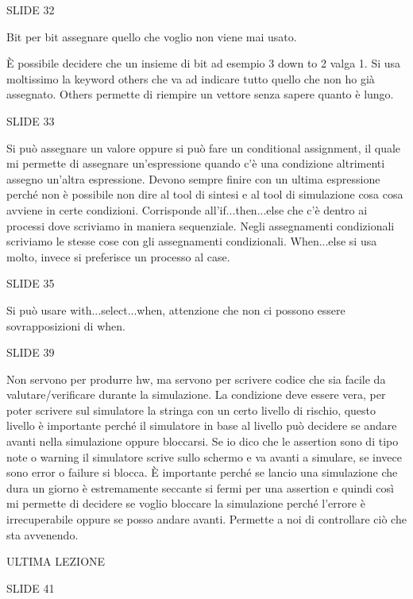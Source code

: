\documentclass[10pt,a4paper,titlepage]{article}
\begin{document}
SLIDE 32

Bit per bit assegnare quello che voglio non viene mai usato.

È possibile decidere che un insieme di bit ad esempio 3 down to 2 valga 1. Si usa moltissimo la keyword others che va ad indicare tutto quello che non ho già assegnato. Others permette di riempire un vettore senza sapere quanto è lungo.﻿

SLIDE 33

Si può assegnare un valore oppure si può fare un conditional assignment, il quale mi permette di assegnare un’espressione quando c’è una condizione altrimenti assegno un’altra espressione. Devono sempre finire con un ultima espressione perché non è possibile non dire al tool di sintesi e al tool di simulazione cosa cosa avviene in certe condizioni. Corrisponde all’if...then...else che c’è dentro ai processi dove scriviamo in maniera sequenziale. Negli assegnamenti condizionali scriviamo le stesse cose con gli assegnamenti condizionali. When...else si usa molto, invece si preferisce un processo al case.﻿

SLIDE 35

Si può usare with...select...when, attenzione che non ci possono essere sovrapposizioni di when.

SLIDE 39

Non servono per produrre hw, ma servono per scrivere codice che sia facile da valutare/verificare durante la simulazione. La condizione deve essere vera, per poter scrivere sul simulatore la stringa con un certo livello di rischio, questo livello è importante perché il simulatore in base al livello può decidere se andare avanti nella simulazione oppure bloccarsi.
Se io dico che le assertion sono di tipo note o warning il simulatore scrive sullo schermo e va avanti a simulare, se invece sono error o failure si blocca.
È importante perché se lancio una simulazione che dura un giorno è estremamente seccante si fermi per una assertion e quindi così mi permette di decidere se voglio bloccare la simulazione perché l’errore è irrecuperabile oppure se posso andare avanti. Permette a noi di controllare ciò che sta avvenendo.﻿

ULTIMA LEZIONE 

SLIDE 41
\end{document}
